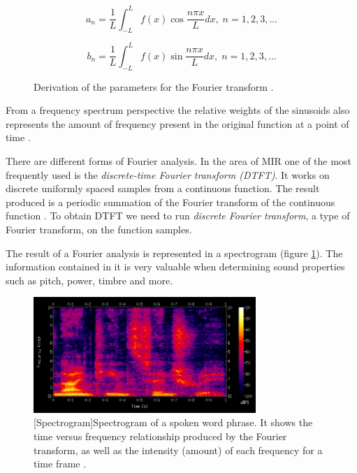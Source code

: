\begin{figure}[H]
    \begin{equation}
        a_n = \frac{1}{L}\int_{-L}^{L}f(x)\cos\frac{n{\pi}x}{L}dx,\; n = 1,2,3,\dots
    \end{equation}

    \begin{equation}
        b_n = \frac{1}{L}\int_{-L}^{L}f(x)\sin\frac{n{\pi}x}{L}dx,\; n = 1,2,3,\dots
    \end{equation}
    \caption[Fourier series parameter derivation]{Derivation of the parameters for the Fourier transform \cite{fourierequations}.}
\end{figure}



From a frequency spectrum perspective the relative weights of the sinusoids also
represents the amount of frequency present in the original function at a point
of time \cite{wiki:fourier}. 

There are different forms of Fourier analysis. In the area of MIR one of the
most frequently used is the \textit{discrete-time Fourier transform (DTFT)}. It
works on discrete uniformly spaced samples from a continuous function. The
result produced is a periodic summation of the Fourier transform of the
continuous function \cite{wiki:dtft}. To obtain DTFT we need to run
\textit{discrete Fourier transform}, a type of Fourier transform, on the function samples.

The result of a Fourier analysis is represented in a spectrogram (figure
\ref{fig:spectrogram}). The information contained in it is very valuable when
determining sound properties such as pitch, power, timbre and more.

\begin{figure}[H]
    \centering
    \includegraphics[width=0.75\textwidth]{BackgroundTheory/spectrogram.png}
    [Spectrogram]{Spectrogram of a spoken word phrase. It shows the time versus frequency relationship produced by the Fourier transform, as well as the intensity (amount) of each frequency for a time frame \cite{wiki:spectrogram}.}
    \label{fig:spectrogram}
\end{figure}

